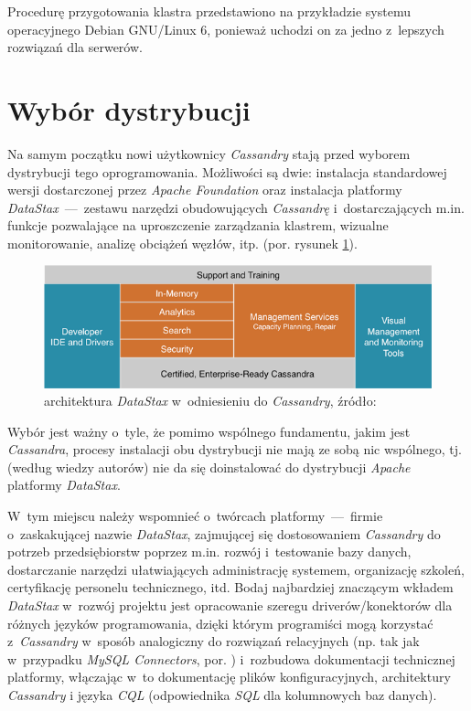 \documentclass{article} %
\begin{document}
Procedurę przygotowania klastra przedstawiono na przykładzie systemu operacyjnego Debian GNU/Linux 6, ponieważ uchodzi on za jedno z~lepszych rozwiązań dla serwerów.

\section{Wybór dystrybucji}\label{sec:distro}

Na samym początku nowi użytkownicy \emph{Cassandry} stają przed wyborem dystrybucji tego oprogramowania.
Możliwości są dwie: instalacja standardowej wersji dostarczonej przez \emph{Apache Foundation} oraz instalacja platformy \emph{DataStax}~---~zestawu narzędzi obudowujących \emph{Cassandrę} i~dostarczających m.in. funkcje pozwalające na uproszczenie zarządzania klastrem, wizualne monitorowanie, analizę obciążeń węzłów, itp. (por. rysunek \ref{fig:datastax_arch}).

\begin{figure}[h]
\centering
\includegraphics[width=\linewidth]{gfx/datastax}
\caption{architektura \emph{DataStax} w~odniesieniu do \emph{Cassandry}, źródło:~\cite{whydatastax}}
\label{fig:datastax_arch}
\end{figure}

Wybór jest ważny o~tyle, że pomimo wspólnego fundamentu, jakim jest \emph{Cassandra}, procesy instalacji obu dystrybucji nie mają ze sobą nic wspólnego, tj. (według wiedzy autorów) nie da się doinstalować do dystrybucji \emph{Apache} platformy \emph{DataStax}.

W~tym miejscu należy wspomnieć o~twórcach platformy~---~firmie o~zaskakującej nazwie \emph{DataStax}, zajmującej się dostosowaniem \emph{Cassandry} do potrzeb przedsiębiorstw poprzez m.in. rozwój i~testowanie bazy danych, dostarczanie narzędzi ułatwiających administrację systemem, organizację szkoleń, certyfikację personelu technicznego, itd.
Bodaj najbardziej znaczącym wkładem \emph{DataStax} w~rozwój projektu jest opracowanie szeregu driverów/konektorów dla różnych języków programowania, dzięki którym programiści mogą korzystać z~\emph{Cassandry} w~sposób analogiczny do rozwiązań relacyjnych (np. tak jak w~przypadku \emph{MySQL Connectors}, por. \cite{mysql_connectors}) i~rozbudowa dokumentacji technicznej platformy, włączając w~to dokumentację plików konfiguracyjnych, architektury \emph{Cassandry} i języka \emph{CQL} (odpowiednika \emph{SQL} dla kolumnowych baz danych).
\end{document}

